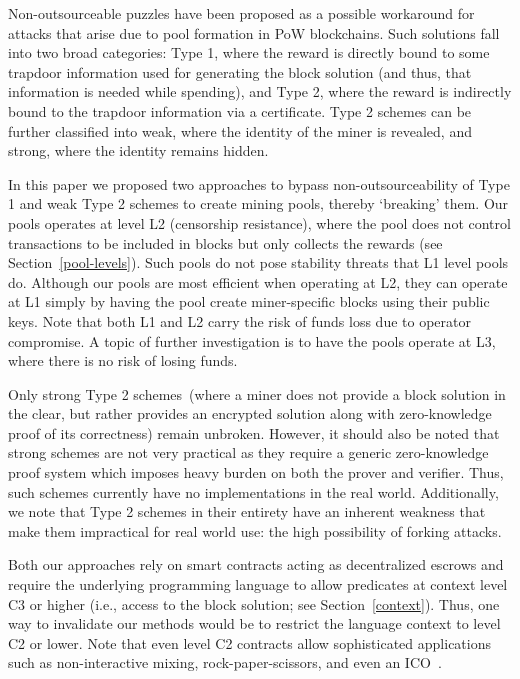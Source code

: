 \documentclass{llncs}
\begin{document}
Non-outsourceable puzzles have been proposed as a possible workaround for attacks that arise due to pool formation in PoW blockchains. Such solutions fall into two broad categories: Type 1, where the reward is directly bound to some trapdoor information used for generating the block solution (and thus, that information is needed while spending), and Type 2, where the reward is indirectly bound to the trapdoor information via a certificate. Type 2 schemes can be further classified into weak, where the identity of the miner is revealed, and strong, where the identity remains hidden. 

In this paper we proposed two approaches to bypass non-outsourceability of Type 1 and weak Type 2
schemes to create mining pools, thereby `breaking' them. Our pools operates at level L2 (censorship resistance), where the pool does not  control transactions to be included in blocks but only collects the rewards (see Section~\ref{pool-levels}). Such pools do not pose stability threats that L1 level pools do. Although our pools are most efficient when operating at L2, they can operate at L1 simply by having the pool create miner-specific blocks using their public keys. 
Note that both L1 and L2 carry the risk of funds loss due to operator compromise. A topic of further investigation is to have the pools operate at L3, where there is no risk of losing funds. 

Only strong Type 2 schemes~(where a miner does not provide a block solution in the clear, but rather provides an encrypted solution
along with zero-knowledge proof of its correctness) remain unbroken. However, it should also be noted that strong schemes are not very practical as they require a generic zero-knowledge proof system which imposes heavy burden on both the prover and verifier. Thus, such schemes currently have no implementations in the real world. Additionally, we note that Type 2 schemes in their entirety have an inherent weakness that make them impractical for real world use: the high possibility of forking attacks. 


Both our approaches rely on smart contracts acting as decentralized escrows and require the underlying programming language to allow predicates at context level C3 or higher (i.e., access to the block solution; see Section~\ref{context}). Thus, one way to invalidate our methods would be to restrict the language context to level C2 or lower. Note that even level C2 contracts allow sophisticated applications such as non-interactive mixing, rock-paper-scissors, and even an ICO~\cite{advtutorial}.
\end{document}
